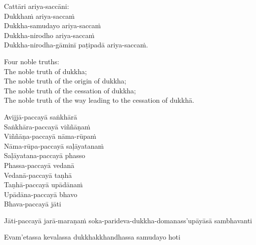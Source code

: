 \suttaRef{[Vibh]}

\begin{pali-hang-continued}
  Cattāri ariya-saccāni:\\
  Dukkhaṁ ariya-saccaṁ\\
  Dukkha-samudayo ariya-saccaṁ\\
  Dukkha-nirodho ariya-saccaṁ\\
  Dukkha-nirodha-gāminī paṭipadā ariya-saccaṁ.
\end{pali-hang-continued}

\begin{english-verses}
  Four noble truths:\\
  The noble truth of dukkha;\\
  The noble truth of the origin of dukkha;\\
  The noble truth of the cessation of dukkha;\\
  The noble truth of the way leading to the cessation of dukkhā.
\end{english-verses}

\suttaRef{[SN 56.24]}

\begin{pali-hang-continued}
  Avijjā-paccayā saṅkhārā\\
  Saṅkhāra-paccayā viññāṇaṁ\\
  Viññāṇa-paccayā nāma-rūpaṁ\\
  Nāma-rūpa-paccayā saḷāyatanaṁ\\
  Saḷāyatana-paccayā phasso\\
  Phassa-paccayā vedanā\\
  Vedanā-paccayā taṇhā\\
  Taṇhā-paccayā upādānaṁ\\
  Upādāna-paccayā bhavo\\
  Bhava-paccayā jāti\\
  \begin{pali-hangtogether}
    Jāti-paccayā jarā-maraṇaṁ soka-parideva-dukkha-domanass'upāyāsā sambhavanti
  \end{pali-hangtogether}
  \begin{pali-hangtogether}
    Evam'etassa kevalassa dukkhakkhandhassa samudayo hoti
  \end{pali-hangtogether}
\end{pali-hang-continued}

